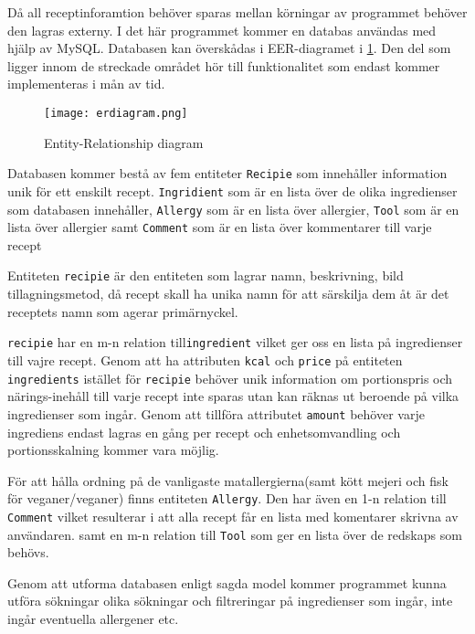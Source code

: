 Då all receptinforamtion behöver sparas mellan körningar av programmet
behöver den lagras externy. I det här programmet kommer en databas
användas med hjälp av MySQL. Databasen kan överskådas i
EER-diagramet i \ref{fig:erdiagram}. Den del som ligger innom de streckade området hör
till funktionalitet som endast kommer implementeras i mån av tid.

\begin{figure}[H]
        \centering
        \texttt{[image: erdiagram.png]}
        \caption{Entity-Relationship diagram}
        \label{fig:erdiagram}
\end{figure}

Databasen kommer bestå av fem entiteter \verb+Recipie+ som innehåller
information unik för ett enskilt recept. \verb+Ingridient+ som är en lista
över de olika ingredienser som databasen innehåller, \verb+Allergy+
som är en lista över allergier, \verb+Tool+ som är en lista över allergier samt
\verb+Comment+ som är en lista över kommentarer till varje recept

Entiteten \verb+recipie+ är den entiteten som lagrar namn, beskrivning, bild
tillagningsmetod, då recept skall ha unika namn för att särskilja dem åt är det
receptets namn som agerar primärnyckel.

\verb+recipie+ har en m-n relation till\verb+ingredient+ vilket ger oss en
lista på ingredienser till vajre recept. Genom att ha attributen \verb+kcal+ och \verb+price+
på entiteten \verb+ingredients+ istället för \verb+recipie+ behöver unik information om
portionspris och närings-inehåll till varje recept inte sparas utan kan räknas ut beroende på vilka
ingredienser som ingår. Genom att tillföra attributet \verb+amount+ behöver varje ingrediens
endast lagras en gång per recept och enhetsomvandling och portionsskalning kommer vara möjlig.

För att hålla ordning på de vanligaste matallergierna(samt kött mejeri och fisk för
veganer/veganer) finns entiteten \verb+Allergy+. Den har även en 1-n relation till \verb+Comment+
vilket resulterar i att alla recept får en lista med komentarer skrivna av användaren. samt en
m-n relation till \verb+Tool+ som ger en lista över de redskaps som behövs.

Genom att utforma databasen enligt sagda model kommer programmet kunna utföra sökningar olika
sökningar och filtreringar på ingredienser som ingår, inte ingår eventuella allergener etc.



